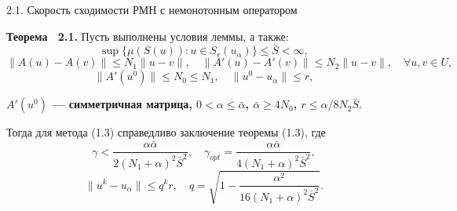 \documentclass[10pt,pdf, mathserif, hyperref={unicode}]{beamer}
\begin{document}
\begin{frame}{\small 2.1. Скорость сходимости РМН с немонотонным оператором}
	\begin{block}{\bf Теорема ~2.1.}
		Пусть выполнены условия леммы, а также: \quad $$\sup\{\mu(S(u)): u\in S_r(u_\alpha)\}\leqslant\bar S <\infty,$$ 
		$$\|A(u)-A(v)\|\leqslant N_1\|u-v\|,\quad
		\|A'(u)-A'(v)\|\leqslant N_2\|u-v\|, \quad \forall u, v \in U,$$
		$$\|A'(u^0)\| \leqslant N_0\leqslant N_1, \quad \|u^0-u_\alpha\| \leqslant r,$$
		
		\smallskip
		{\textbf{\color{blue}$A'(u^0)$ --- симметричная матрица, $0<\alpha\leqslant\bar\alpha$, $\bar\alpha\geqslant 4N_0$, $r\leqslant\alpha/8N_2\bar S$}}.
		
		\smallskip
		Тогда для метода (1.3) справедливо заключение теоремы (1.3), где
		$$\gamma<\frac{\alpha\bar\alpha}{2(N_1+\alpha)^2\bar S^2},
		\quad
		{\gamma}_{opt}=\frac{\alpha\bar\alpha}{4(N_1+\alpha)^2\bar S^2},$$ 
		$$\|u^k-u_\alpha\|\leqslant q^k r, \quad q=\sqrt{1-\frac{\alpha ^2}{16(N_1+\alpha)^2\bar S^2}}.$$
	\end{block}
\end{frame}
\end{document}
